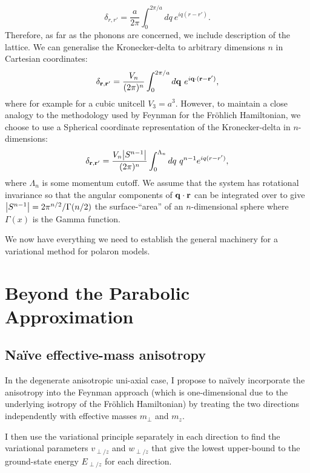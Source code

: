 \begin{equation}
    \delta _{r, r'} = \frac{a}{2\pi} \int_0^{2\pi / a} dq\ e^{i q (r - r')} .
\end{equation}
Therefore, as far as the phonons are concerned, we include description of the lattice. We can generalise the Kronecker-delta to arbitrary dimensions $n$ in Cartesian coordinates:
\begin{equation}
    \delta_{\vb{r}, \vb{r'}} = \frac{V_n}{(2\pi)^n} \int_0^{2\pi/a} d\vb{q}\ e^{i \vb{q} \cdot (\vb{r} - \vb{r'})} ,
\end{equation}
where for example for a cubic unitcell $V_3 = a^3$. However, to maintain a close analogy to the methodology used by Feynman for the Fr\"ohlich Hamiltonian, we choose to use a Spherical coordinate representation of the Kronecker-delta in $n$-dimensions:
\begin{equation}
    \delta_{\vb{r}, \vb{r'}} = \frac{V_n \abs{S^{n-1}}}{(2\pi)^n} \int_0^{\Lambda_n} dq\ q^{n-1} e^{i q (r - r')} ,
\end{equation}
where $\Lambda_n$ is some momentum cutoff. We assume that the system has rotational invariance so that the angular components of $\vb{q} \cdot \vb{r}$ can be integrated over to give $\abs{S^{n-1}} = 2\pi^{n/2} / \Gamma(n/2)$ the surface-``area'' of an $n$-dimensional sphere where $\Gamma(x)$ is the Gamma function.
\newline

We now have everything we need to establish the general machinery for a variational method for polaron models.

\section{Beyond the Parabolic Approximation}
\label{sec:3-2}

\subsection{Na\"ive effective-mass anisotropy}
\label{subsec:3-2-1}

In the degenerate anisotropic uni-axial case, I propose to na\"ively incorporate the anisotropy into the Feynman approach (which is one-dimensional due to the underlying isotropy of the Fr\"ohlich Hamiltonian) by treating the two directions independently with effective masses $m_\perp$ and $m_z$.

I then use the variational principle separately in each direction to find the variational parameters $v_{\perp/z}$ and $w_{\perp/z}$ that give the lowest upper-bound to the ground-state energy $E_{\perp/z}$ for each direction. 

